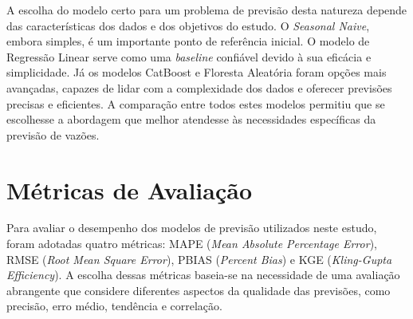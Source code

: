 A escolha do modelo certo para um problema de previsão desta natureza depende das características dos dados e dos objetivos do estudo. O \textit{Seasonal Naive}, embora simples, é um importante ponto de referência inicial. O modelo de Regressão Linear serve como uma \textit{baseline} confiável devido à sua eficácia e simplicidade. Já os modelos CatBoost e Floresta Aleatória foram opções mais avançadas, capazes de lidar com a complexidade dos dados e oferecer previsões precisas e eficientes. A comparação entre todos estes modelos permitiu que se escolhesse a abordagem que melhor atendesse às necessidades específicas da previsão de vazões.

\section{Métricas de Avaliação}

Para avaliar o desempenho dos modelos de previsão utilizados neste estudo, foram adotadas quatro métricas: MAPE (\textit{Mean Absolute Percentage Error}), RMSE (\textit{Root Mean Square Error}), PBIAS (\textit{Percent Bias}) e KGE (\textit{Kling-Gupta Efficiency}). A escolha dessas métricas baseia-se na necessidade de uma avaliação abrangente que considere diferentes aspectos da qualidade das previsões, como precisão, erro médio, tendência e correlação.

